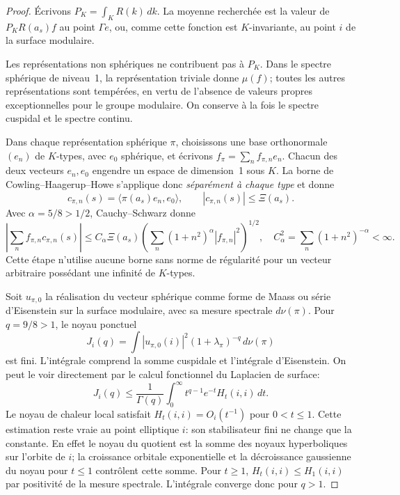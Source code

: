 \begin{proof}
Écrivons $P_K=\int_K R(k)\,dk$. La moyenne recherchée est la valeur de
$P_KR(a_s)f$ au point $\Gamma e$, ou, comme cette fonction est
$K$-invariante, au point $i$ de la surface modulaire.

Les représentations non sphériques ne contribuent pas à $P_K$.
Dans le spectre sphérique de niveau~1, la représentation triviale donne
$\mu(f)$; toutes les autres représentations sont tempérées, en vertu de
l'absence de valeurs propres exceptionnelles pour le groupe modulaire.
On conserve à la fois le spectre cuspidal et le spectre continu.

Dans chaque représentation sphérique $\pi$, choisissons une base
orthonormale $(e_n)$ de $K$-types, avec $e_0$ sphérique, et écrivons
$f_\pi=\sum_n f_{\pi,n}e_n$. Chacun des deux vecteurs $e_n,e_0$ engendre
un espace de dimension~1 sous $K$. La borne de Cowling--Haagerup--Howe
s'applique donc \emph{séparément à chaque type} et donne
\[
 c_{\pi,n}(s)=\langle\pi(a_s)e_n,e_0\rangle,
 \qquad |c_{\pi,n}(s)|\le\Xi(a_s).
\]
Avec $\alpha=5/8>1/2$, Cauchy--Schwarz donne
\[
 \left|\sum_n f_{\pi,n}c_{\pi,n}(s)\right|
 \le C_\alpha\Xi(a_s)
       \left(\sum_n(1+n^2)^\alpha|f_{\pi,n}|^2\right)^{1/2},
 \quad C_\alpha^2=\sum_n(1+n^2)^{-\alpha}<\infty.
 \tag{S2}
\]
Cette étape n'utilise aucune borne sans norme de régularité pour un
vecteur arbitraire possédant une infinité de $K$-types.

Soit $u_{\pi,0}$ la réalisation du vecteur sphérique comme forme de
Maass ou série d'Eisenstein sur la surface modulaire, avec sa mesure
spectrale $d\nu(\pi)$. Pour $q=9/8>1$, le noyau ponctuel
\[
 J_i(q)=\int |u_{\pi,0}(i)|^2(1+\lambda_\pi)^{-q}\,d\nu(\pi)
 \tag{S3}
\]
est fini. L'intégrale comprend la somme cuspidale et l'intégrale
d'Eisenstein. On peut le voir directement par le calcul fonctionnel du
Laplacien de surface:
\[
 J_i(q)\le\frac1{\Gamma(q)}
     \int_0^\infty t^{q-1}e^{-t}H_t(i,i)\,dt.
\]
Le noyau de chaleur local satisfait $H_t(i,i)=O_i(t^{-1})$ pour
$0<t\le1$. Cette estimation reste vraie au point elliptique $i$:
son stabilisateur fini ne change que la constante. En effet le noyau
du quotient est la somme des noyaux hyperboliques sur l'orbite de $i$;
la croissance orbitale exponentielle et la décroissance gaussienne
du noyau pour $t\le1$ contrôlent cette somme. Pour $t\ge1$,
$H_t(i,i)\le H_1(i,i)$ par positivité de la mesure spectrale.
L'intégrale converge donc pour $q>1$.


\end{proof}
